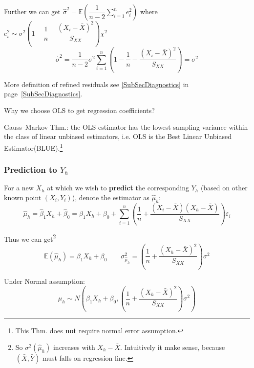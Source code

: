     Further we can get $ \hat{\sigma }^2=\mathbb{E}(\dfrac{1}{n-2}\sum_{i=1}^ne_i^2) $ where $ e_i^2\sim \sigma ^2\left( 1-\dfrac{1}{n}-\dfrac{(X_i-\bar{X})^2}{S_{XX}} \right)\chi^2 $
    \begin{equation}
        \hat{\sigma }^2=\dfrac{1}{n-2}\sigma ^2\sum_{i=1}^n(1-\dfrac{1}{n}-\dfrac{(X_i-\bar{X})^2}{S_{XX}})=\sigma ^2
    \end{equation}
    
    More definition of refined residuals see \autoref{SubSecDiagnostics} in page~\ref{SubSecDiagnostics}.
    


\begin{point}
    Why we choose OLS to get regression coefficients?


    Gauss–Markov Thm.: the OLS estimator has the lowest sampling variance within the class of linear unbiased estimators, i.e. OLS is the Best Linear Unbiased Estimator(BLUE).\footnote{This Thm. does \textbf{not }require normal error assumption.}
\end{point}
    



\subsubsection{Prediction to $ Y_h $}
    For a new $ X_h $ at which we wish to \textbf{predict }the corresponding $ Y_h $ (based on other known point $ (X_i,Y_i) $), denote the estimator as $ \hat{\mu}_h $:
    \begin{equation}
        \hat{\mu}_h=\hat{\beta}_1X_h+\hat{\beta}_0 =\beta_1X_h+\beta _0+\sum_{i=1}^n\left( \dfrac{1}{n}+\dfrac{(X_i-\bar{X})(X_h-\bar{X})}{S_{XX}} \right)\varepsilon _i
    \end{equation}
    
    Thus we can get\footnote{So $ \sigma ^2(\hat{\mu }_h) $ increases with $ X_h-\bar{X} $. Intuitively it make sense, because $ (\bar{X},\bar{Y})$ must falls on regression line.}
    \begin{equation}
        \mathbb{E}(\hat{\mu}_h)= \beta _1X_h+\beta _0\qquad \sigma ^2_{\hat{\mu}_h}=\left( \dfrac{1}{n}+\dfrac{(X_h-\bar{X})^2}{S_{XX}} \right)\sigma^2
    \end{equation}
    
    Under Normal assumption:
    \begin{equation}
        \hat{\mu}_h\sim N(\beta _1X_h+\beta _0,\left( \dfrac{1}{n}+\dfrac{(X_h-\bar{X})^2}{S_{XX}} \right)\sigma^2) 
    \end{equation}
    
